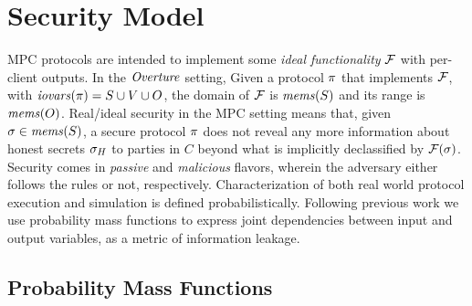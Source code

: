 \section{Security Model}
\label{section-pmf}
\label{section-model}

MPC protocols are intended to implement some \emph{ideal
functionality} $\mathcal{F}$ with per-client outputs. In the $\mathit{Overture}$
setting, Given a protocol $\pi$ that implements $\mathcal{F}$, with
$\mathit{iovars}(\pi) = S \cup V \cup O$, the domain of $\mathcal{F}$ is $\mathit{mems}(S)$
and its range is $\mathit{mems}(O)$.  Real/ideal security in the MPC
setting means that, given $\sigma \in \mathit{mems}(S)$, a secure protocol
$\pi$ does not reveal any more information about honest secrets
$\sigma_H$ to parties in $C$ beyond what is implicitly declassified by
$\mathcal{F}(\sigma)$. Security comes in \emph{passive} and
\emph{malicious} flavors, wherein the adversary either follows the
rules or not, respectively. Characterization of both real world
protocol execution and simulation is defined
probabilistically. Following previous work
\cite{barthe2019probabilistic} we use probability mass functions to
express joint dependencies between input and output variables, as a
metric of information leakage.

\subsection{Probability Mass Functions} 

